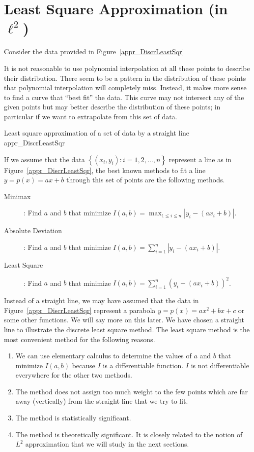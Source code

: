 \chapter{Least Square Approximation (in $\ell^2$)}
\label{ChaptApproxC}

Consider the data provided in Figure~\ref{appr_DiscrLeastSqr}

It is not reasonable to use polynomial interpolation at all these points to
describe their distribution.  There seem to be a pattern in the distribution
of these points that polynomial interpolation will completely miss.  Instead,
it makes more sense to find a curve that ``best fit'' the data.  This curve
may not intersect any of the given points but may better describe the
distribution of these points; in particular if we want to extrapolate from
this set of data.

{Least square approximation of a set of data by a straight line}
{appr_DiscrLeastSqr}

If we assume that the data $\left\{ (x_i,y_i) : i=1,2,\ldots, n\right\}$
represent a line as in Figure~\ref{appr_DiscrLeastSqr}, the best known
methods to fit a line $y=p(x)=ax+b$ through this set of points are the
following methods.
\begin{description}
\item[Minimax]: Find $a$ and $b$ that minimize
$\displaystyle I(a,b) = \max_{1\leq i \leq n} \left| y_i - (ax_i+b) \right|$.
\item[Absolute Deviation]: Find $a$ and $b$ that minimize
$\displaystyle I(a,b) = \sum_{i=1}^{n} \left| y_i - (ax_i+b)\right|$.
\item[Least Square]: Find $a$ and $b$ that minimize
$\displaystyle I(a,b) = \sum_{i=1}^{n} \left( y_i - (ax_i+b)\right)^2$.
\end{description}

Instead of a straight line, we may have assumed that the data in
Figure~\ref{appr_DiscrLeastSqr} represent a parabola $y=p(x)= ax^2+bx+c$ or
some other functions.  We will say more on this later.  We have chosen a
straight line to illustrate the discrete least square method.  The least
square method is the most convenient method for the following reasons.
\begin{enumerate}
\item We can use elementary calculus to determine the values of $a$ and $b$
that minimize $I(a,b)$ because $I$ is a differentiable function.  $I$ is not
differentiable everywhere for the other two methods.
\item The method does not assign too much weight to the few points which are
far away (vertically) from the straight line that we try to fit.
\item The method is statistically significant.
\item The method is theoretically significant.  It is closely related to the
notion of $L^2$ approximation that we will study in the next sections.
\end{enumerate}

